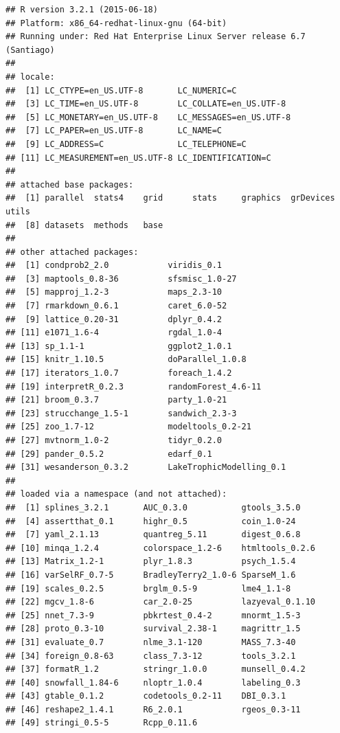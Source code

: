 \documentclass[12pt,]{article}
\begin{document}
\begin{verbatim}
## R version 3.2.1 (2015-06-18)
## Platform: x86_64-redhat-linux-gnu (64-bit)
## Running under: Red Hat Enterprise Linux Server release 6.7 (Santiago)
## 
## locale:
##  [1] LC_CTYPE=en_US.UTF-8       LC_NUMERIC=C              
##  [3] LC_TIME=en_US.UTF-8        LC_COLLATE=en_US.UTF-8    
##  [5] LC_MONETARY=en_US.UTF-8    LC_MESSAGES=en_US.UTF-8   
##  [7] LC_PAPER=en_US.UTF-8       LC_NAME=C                 
##  [9] LC_ADDRESS=C               LC_TELEPHONE=C            
## [11] LC_MEASUREMENT=en_US.UTF-8 LC_IDENTIFICATION=C       
## 
## attached base packages:
##  [1] parallel  stats4    grid      stats     graphics  grDevices utils    
##  [8] datasets  methods   base     
## 
## other attached packages:
##  [1] condprob2_2.0            viridis_0.1             
##  [3] maptools_0.8-36          sfsmisc_1.0-27          
##  [5] mapproj_1.2-3            maps_2.3-10             
##  [7] rmarkdown_0.6.1          caret_6.0-52            
##  [9] lattice_0.20-31          dplyr_0.4.2             
## [11] e1071_1.6-4              rgdal_1.0-4             
## [13] sp_1.1-1                 ggplot2_1.0.1           
## [15] knitr_1.10.5             doParallel_1.0.8        
## [17] iterators_1.0.7          foreach_1.4.2           
## [19] interpretR_0.2.3         randomForest_4.6-11     
## [21] broom_0.3.7              party_1.0-21            
## [23] strucchange_1.5-1        sandwich_2.3-3          
## [25] zoo_1.7-12               modeltools_0.2-21       
## [27] mvtnorm_1.0-2            tidyr_0.2.0             
## [29] pander_0.5.2             edarf_0.1               
## [31] wesanderson_0.3.2        LakeTrophicModelling_0.1
## 
## loaded via a namespace (and not attached):
##  [1] splines_3.2.1       AUC_0.3.0           gtools_3.5.0       
##  [4] assertthat_0.1      highr_0.5           coin_1.0-24        
##  [7] yaml_2.1.13         quantreg_5.11       digest_0.6.8       
## [10] minqa_1.2.4         colorspace_1.2-6    htmltools_0.2.6    
## [13] Matrix_1.2-1        plyr_1.8.3          psych_1.5.4        
## [16] varSelRF_0.7-5      BradleyTerry2_1.0-6 SparseM_1.6        
## [19] scales_0.2.5        brglm_0.5-9         lme4_1.1-8         
## [22] mgcv_1.8-6          car_2.0-25          lazyeval_0.1.10    
## [25] nnet_7.3-9          pbkrtest_0.4-2      mnormt_1.5-3       
## [28] proto_0.3-10        survival_2.38-1     magrittr_1.5       
## [31] evaluate_0.7        nlme_3.1-120        MASS_7.3-40        
## [34] foreign_0.8-63      class_7.3-12        tools_3.2.1        
## [37] formatR_1.2         stringr_1.0.0       munsell_0.4.2      
## [40] snowfall_1.84-6     nloptr_1.0.4        labeling_0.3       
## [43] gtable_0.1.2        codetools_0.2-11    DBI_0.3.1          
## [46] reshape2_1.4.1      R6_2.0.1            rgeos_0.3-11       
## [49] stringi_0.5-5       Rcpp_0.11.6
\end{verbatim}
\end{document}
